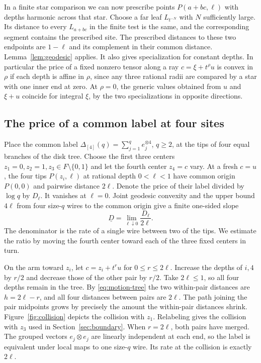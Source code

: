 In a finite star comparison we can now prescribe points
\(P(a+bc,\ell)\) with depths harmonic across that star. Choose a
far leaf \(L_{t^{-N}}\) with \(N\) sufficiently large. Its distance
to every \(L_{a+bc}\) in the finite test is the same, and the
corresponding segment contains the prescribed site. The prescribed distances to these
two endpoints are \(1-\ell\) and its complement in their common
distance. Lemma~\ref{lem:geodesic} applies. It also gives specialization
for constant depths. In particular the price of a fixed nonzero tensor along a ray
\(c=\xi+t^\rho u\) is convex in \(\rho\) if each depth is affine in
\(\rho\), since any three rational radii are compared by a star with
one inner end at zero. At \(\rho=0\), the generic values obtained
from \(u\) and \(\xi+u\) coincide for integral \(\xi\), by the two
specializations in opposite directions.

\subsection{The price of a common label at four sites}

Place the common label \(\Delta_{[4]}(q)=\sum_{j=1}^q e_j^{\otimes4}\),
\(q\ge2\), at the tips of four equal branches of the disk tree. Choose
the first three centers \(z_1=0,z_2=1,z_3\in F\setminus\{0,1\}\)
and let the fourth center \(z_4=c\) vary. At a fresh \(c=u\), the
four tips \(P(z_i,\ell)\) at rational depth \(0<\ell<1\) have common
origin \(P(0,0)\) and pairwise distance \(2\ell\). Denote the price
of their label divided by \(\log q\) by \(D_\ell\). It vanishes at
\(\ell=0\). Joint geodesic convexity and the upper bound \(4\ell\)
from four size-\(q\) wires to the common origin give a finite
one-sided slope
\[
 \underline D=\lim_{\ell\downarrow0}\frac{D_\ell}{2\ell}.
\]
The denominator is the rate of a single wire between two of the tips.
We estimate the ratio by moving the fourth center toward each of the
three fixed centers in turn.

On the arm toward \(z_i\), let \(c=z_i+t^r u\) for \(0\le r\le2\ell\).
Increase the depths of \(i,4\) by \(r/2\) and decrease those of the
other pair by \(r/2\). Take \(2\ell\le1\), so all four depths remain
in the tree. By \eqref{eq:motion-tree} the two within-pair distances
are \(h=2\ell-r\), and all four distances between pairs are \(2\ell\).
The path joining the pair midpoints grows by precisely the amount
the within-pair distances shrink. Figure~\ref{fig:collision} depicts
the collision with \(z_1\). Relabeling gives the collision with \(z_3\)
used in Section~\ref{sec:boundary}. When \(r=2\ell\), both pairs have
merged. The grouped vectors \(e_j\otimes e_j\) are linearly independent
at each end, so the label is equivalent under local maps to one
size-\(q\) wire. Its rate at the collision is exactly \(2\ell\).

